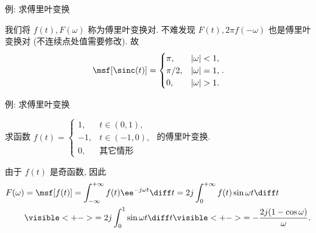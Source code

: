 \begin{frame}{例: 求傅里叶变换}
	\onslide<+->
	\begin{center}
	\end{center}
	\onslide<+->
	我们将 $f(t),F(\omega)$ 称为傅里叶变换对.
	\onslide<+->
	不难发现 $F(t),2\pi f(-\omega)$ 也是傅里叶变换对 (不连续点处值需要修改).
	\onslide<+->
	故
	\[\msf[\sinc(t)]=\begin{cases}
		\pi,&|\omega|<1,\\
		\pi/2,&|\omega|=1,\\
		0,&|\omega|>1.
		\end{cases}.
	\]
\end{frame}


\begin{frame}{例: 求傅里叶变换}
	\onslide<+->
	\begin{example}
		求函数 $f(t)=
			\begin{cases}
				1,&t\in(0,1),\\
				-1,&t\in(-1,0),\\
				0,&\text{其它情形}
			\end{cases}$
		的傅里叶变换.
	\end{example}

	\onslide<+->
	\begin{solution}
		由于 $f(t)$ 是奇函数, 因此
		\begin{align*}
			F(\omega)&=\msf[f(t)]
			=\int_{-\infty}^{+\infty}f(t)\ee^{-j\omega t}\diff t
			=2j\int_0^{+\infty}f(t)\sin{\omega t}\diff t\\
			&\visible<+->{=2j\int_0^1\sin{\omega t}\diff t}
			\visible<+->{=-\frac{2j(1-\cos\omega)}\omega.}
		\end{align*}
	\end{solution}
\end{frame}


